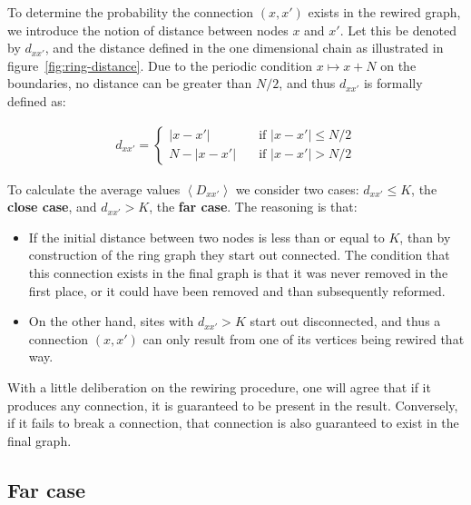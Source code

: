 To determine the probability the connection $(x, x')$ exists in the rewired graph, we introduce the notion of distance between nodes
$x$ and $x'$. Let this be denoted by $d_{xx'}$, and the distance defined in the one dimensional chain as illustrated in
figure~\ref{fig:ring-distance}. Due to the periodic condition $x \mapsto x+N$ on the boundaries, no distance can be greater than $N/2$,
and thus $d_{xx'}$ is formally defined as:

\begin{align}
    d_{xx'} =
    \begin{cases}
        |x-x'| \quad &\text{if $|x-x'|\leq N/2$} \\
        N-|x-x'| \quad &\text{if $|x-x'| > N/2$}
    \end{cases}
    \label{dist}
\end{align}

To calculate the average values $\left< D_{xx'} \right>$ we consider two cases: $d_{xx'} \leq K$, the \textbf{close case}, and $d_{xx'}
> K$, the \textbf{far case}. The reasoning is that:

\begin{itemize}
    \item If the initial distance between two nodes is less than or equal to $K$, than by construction of the ring graph they start out
        connected. The condition that this connection exists in the final graph is that it was never removed in the first place, or it
        could have been removed and than subsequently reformed.

    \item On the other hand, sites with $d_{xx'}>K$ start out disconnected, and thus a connection $(x,x')$ can only result from one of
        its vertices being rewired that way.
\end{itemize}

With a little deliberation on the rewiring procedure, one will agree that if it produces any connection, it is guaranteed to be present
in the result. Conversely, if it fails to break a connection, that connection is also guaranteed to exist in the final graph.

\subsection{Far case}


